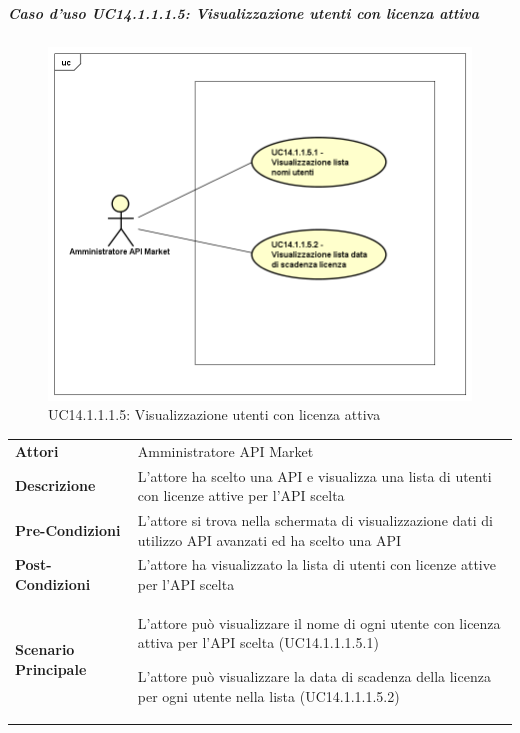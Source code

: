 \newpage
\subparagraph{Caso d'uso UC14.1.1.1.5: Visualizzazione utenti con licenza attiva}
\label{UC14_1_1_1_5}
\begin{figure}[ht]
	\centering
	\includegraphics[scale=0.45]{UML/UC14_1_1_1_5.png}
	\caption{UC14.1.1.1.5: Visualizzazione utenti con licenza attiva}
\end{figure}

\begin{minipage}{\linewidth}
	\begin{tabular}{ l | p{11cm}}
		\hline
		\rowcolor{Gray}
		\multicolumn{2}{c}{UC14.1.1.1.5 - Visualizzazione utenti con licenza attiva} \\
		\hline
		\textbf{Attori} & Amministratore API Market \\
		\textbf{Descrizione} & L'attore ha scelto una API e visualizza una lista di utenti con licenze attive per l'API scelta\\
		\textbf{Pre-Condizioni} & L'attore si trova nella schermata di visualizzazione dati di utilizzo API avanzati ed ha scelto una API \\
		\textbf{Post-Condizioni} & L'attore ha visualizzato la lista di utenti con licenze attive per l'API scelta \\
		\textbf{Scenario Principale} & 
		\begin{enumerate*}[label=(\arabic*.),itemjoin={\newline}]
			\item L'attore può visualizzare il nome di ogni utente con licenza attiva per l'API scelta (UC14.1.1.1.5.1)
			\item L'attore può visualizzare la data di scadenza della licenza per ogni utente nella lista (UC14.1.1.1.5.2)
		\end{enumerate*}\\
	\end{tabular}
\end{minipage}

